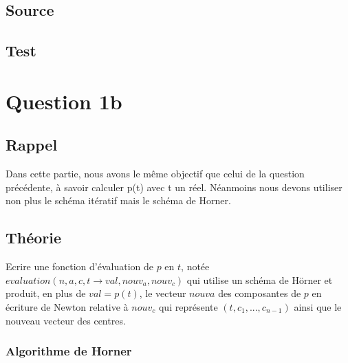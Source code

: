 \documentclass[a4paper,10pt]{report}
\begin{document}
\subsection*{Source}

\begin{center}
	
\end{center}

\begin{center}
	
\end{center}

\subsection*{Test}

\section*{Question 1b}

\subsection*{Rappel}

Dans cette partie, nous avons le même objectif que celui de la question précédente, à savoir calculer p(t) avec t un réel. Néanmoins nous devons utiliser non plus le schéma itératif mais le schéma de Horner. 

\subsection*{Théorie}

Ecrire une fonction d’évaluation de $p$ en $t$, notée $evaluation(n, a, c, t →
val, nouv_a, nouv_c)$ qui utilise un schéma de Hörner et produit, en plus de
$val = p(t)$, le vecteur $nouv{a}$ des composantes de $p$ en écriture de Newton
relative à $nouv_c$ qui représente $(t, c_{1}, ..., c_{n−1})$ ainsi que le nouveau vecteur des centres.

\subsubsection*{Algorithme de Horner}
\end{document}
